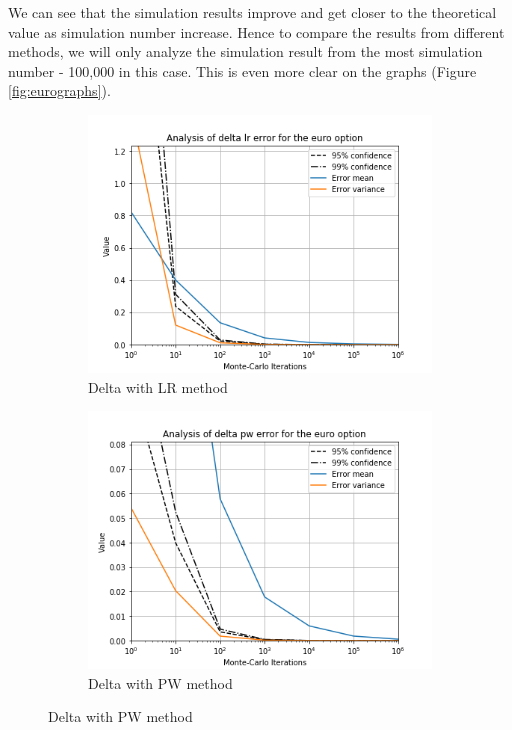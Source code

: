 \documentclass[11pt,a4paper,fleqn,draft]{article}
\begin{document}
We can see that the simulation results improve and get closer to the theoretical value as simulation number increase. Hence to compare the results from different methods, we will only analyze the simulation result from the most simulation number - 100,000 in this case. This is even more clear on the graphs (Figure \ref{fig:eurographs}).

\begin{figure}
  \centering
      \begin{subfigure}[b]{0.45\textwidth}
          \includegraphics[width=\textwidth]{graphs/eurodeltalr.png}
          \caption{Delta with LR method}
      \end{subfigure}
      \begin{subfigure}[b]{0.45\textwidth}
          \includegraphics[width=\textwidth]{graphs/eurodeltapw.png}
          \caption{Delta with PW method}
      \end{subfigure}


\end{figure}
\end{document}
